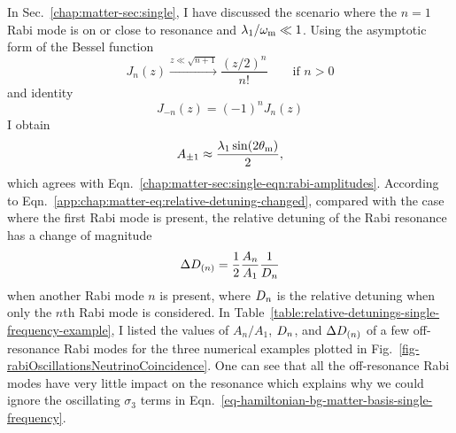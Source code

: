 In Sec.~\ref{chap:matter-sec:single}, I have discussed the scenario where the $n=1$ Rabi mode is on or close to resonance and $\lambda_1/\omega_\mathrm m \ll 1$. Using the asymptotic form of the Bessel function
\begin{equation}
    J_n(z) \xrightarrow{z\ll \sqrt{n+1}} \frac{ (z/2)^n }{n!} \qquad \text{if } n>0
\end{equation}
and identity
\begin{equation}
    J_{-n}(z) =(-1)^n J_{n}(z)
\end{equation}
I obtain
\begin{equation}
    A_{\pm 1} \approx \frac{ \lambda_1 \sin (2\theta_\mathrm m)}{2},
\end{equation}
which agrees with Eqn.~\ref{chap:matter-sec:single-eqn:rabi-amplitudes}. According to Eqn.~\ref{app:chap:matter-eq:relative-detuning-changed}, compared with the case where the first Rabi mode is present, the relative detuning of the Rabi resonance has a change of magnitude
\begin{equation}
\Delta D_{(n)} = \frac{1}{2} \frac{A_n}{A_1} \frac{1}{D_n}
\end{equation}
when another Rabi mode $n$ is present, where $D_n$ is the relative detuning when only the $n$th Rabi mode is considered. In Table~\ref{table:relative-detunings-single-frequency-example}, I listed the values of $A_n/A_1$, $D_n$, and $\Delta D_{(n)}$ of a few off-resonance Rabi modes for the three numerical examples plotted in Fig.~\ref{fig-rabiOscillationsNeutrinoCoincidence}. One can see that all the off-resonance Rabi modes have very little impact on the resonance which explains why we could ignore the oscillating $\sigma_3$ terms in Eqn.~\ref{eq-hamiltonian-bg-matter-basis-single-frequency}.



